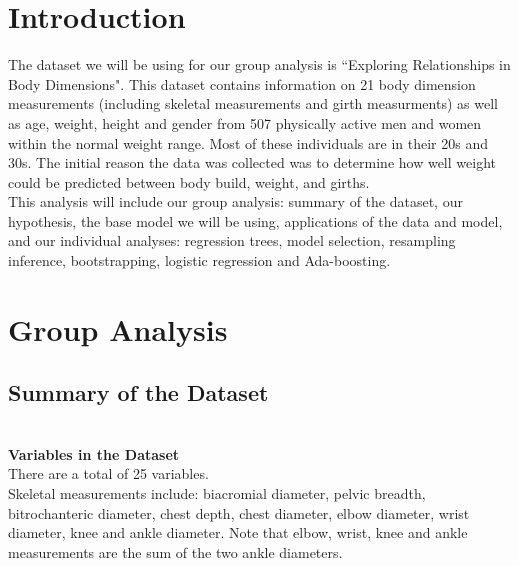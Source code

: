 \documentclass[11pt]{article}
\begin{document}


\section{Introduction} %

The dataset we will be using for our group analysis is ``Exploring Relationships in Body Dimensions". This dataset contains information on 21 body dimension measurements (including skeletal measurements and girth measurments) as well as age, weight, height and gender from 507 physically active men and women within the normal weight range. Most of these individuals are in their 20s and 30s. The initial reason the data was collected was to determine how well weight could be predicted between body build, weight, and girths. \\ 

This analysis will include our group analysis: summary of the dataset, our hypothesis, the base model we will be using, applications of the data and model, and our individual analyses: regression trees, model selection, resampling inference, bootstrapping, logistic regression and Ada-boosting.

\section{Group Analysis} 




\subsection{Summary of the Dataset}

\\

\textbf{Variables in the Dataset}\\ %

There are a total of 25 variables.\\

Skeletal measurements include: biacromial diameter, pelvic breadth, bitrochanteric diameter, chest depth, chest diameter, elbow diameter, wrist diameter, knee and ankle diameter. Note that elbow, wrist, knee and ankle measurements are the sum of the two ankle diameters.\\
\end{document}

